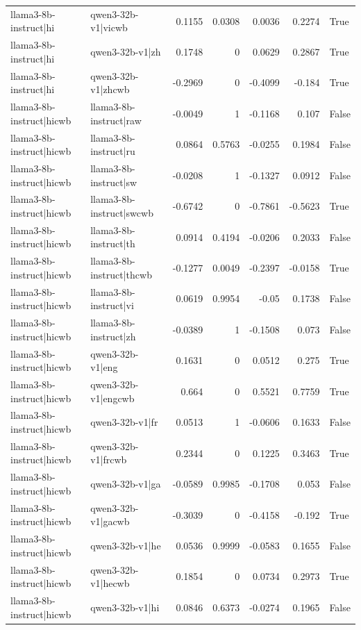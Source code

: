 \begin{table}
\begin{tabular}{l l r r r r l}
llama3-8b-instruct|hi & qwen3-32b-v1|vicwb & 0.1155 & 0.0308 & 0.0036 & 0.2274 & True \\
llama3-8b-instruct|hi & qwen3-32b-v1|zh & 0.1748 & 0 & 0.0629 & 0.2867 & True \\
llama3-8b-instruct|hi & qwen3-32b-v1|zhcwb & -0.2969 & 0 & -0.4099 & -0.184 & True \\
llama3-8b-instruct|hicwb & llama3-8b-instruct|raw & -0.0049 & 1 & -0.1168 & 0.107 & False \\
llama3-8b-instruct|hicwb & llama3-8b-instruct|ru & 0.0864 & 0.5763 & -0.0255 & 0.1984 & False \\
llama3-8b-instruct|hicwb & llama3-8b-instruct|sw & -0.0208 & 1 & -0.1327 & 0.0912 & False \\
llama3-8b-instruct|hicwb & llama3-8b-instruct|swcwb & -0.6742 & 0 & -0.7861 & -0.5623 & True \\
llama3-8b-instruct|hicwb & llama3-8b-instruct|th & 0.0914 & 0.4194 & -0.0206 & 0.2033 & False \\
llama3-8b-instruct|hicwb & llama3-8b-instruct|thcwb & -0.1277 & 0.0049 & -0.2397 & -0.0158 & True \\
llama3-8b-instruct|hicwb & llama3-8b-instruct|vi & 0.0619 & 0.9954 & -0.05 & 0.1738 & False \\
llama3-8b-instruct|hicwb & llama3-8b-instruct|zh & -0.0389 & 1 & -0.1508 & 0.073 & False \\
llama3-8b-instruct|hicwb & qwen3-32b-v1|eng & 0.1631 & 0 & 0.0512 & 0.275 & True \\
llama3-8b-instruct|hicwb & qwen3-32b-v1|engcwb & 0.664 & 0 & 0.5521 & 0.7759 & True \\
llama3-8b-instruct|hicwb & qwen3-32b-v1|fr & 0.0513 & 1 & -0.0606 & 0.1633 & False \\
llama3-8b-instruct|hicwb & qwen3-32b-v1|frcwb & 0.2344 & 0 & 0.1225 & 0.3463 & True \\
llama3-8b-instruct|hicwb & qwen3-32b-v1|ga & -0.0589 & 0.9985 & -0.1708 & 0.053 & False \\
llama3-8b-instruct|hicwb & qwen3-32b-v1|gacwb & -0.3039 & 0 & -0.4158 & -0.192 & True \\
llama3-8b-instruct|hicwb & qwen3-32b-v1|he & 0.0536 & 0.9999 & -0.0583 & 0.1655 & False \\
llama3-8b-instruct|hicwb & qwen3-32b-v1|hecwb & 0.1854 & 0 & 0.0734 & 0.2973 & True \\
llama3-8b-instruct|hicwb & qwen3-32b-v1|hi & 0.0846 & 0.6373 & -0.0274 & 0.1965 & False \\

\end{tabular}
\end{table}
